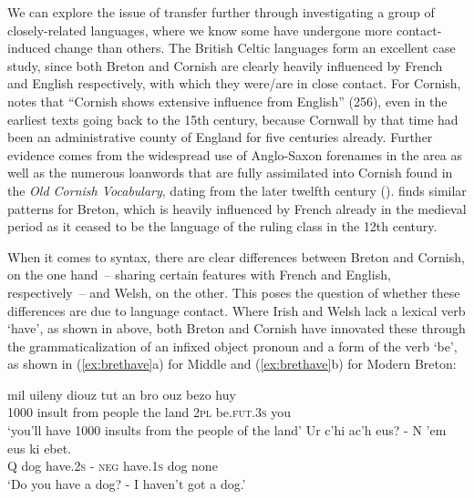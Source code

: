 \documentclass[output=paper,colorlinks,citecolor=brown]{langscibook}
\begin{document}
We can explore the issue of transfer further through investigating a group of closely-related languages, where we know some have undergone more contact-induced change than others. The British Celtic languages form an excellent case study, since both Breton and Cornish are clearly heavily influenced by French and English respectively, with which they were/are in close contact. For Cornish, \citet{mm:padel_english_2021} notes that ``Cornish shows extensive influence from English'' (256), even in the earliest texts going back to the 15th century, because Cornwall by that time had been an administrative county of England for five centuries already. Further evidence comes from the widespread use of Anglo-Saxon forenames in the area as well as the numerous loanwords that are fully assimilated into Cornish found in the \textit{Old Cornish Vocabulary}, dating from the later twelfth century (\citealt{mm:graves_old_1962}). \citet{mm:humphreys_breton_1992}  finds similar patterns for Breton, which is heavily influenced by French already in the medieval period as it ceased to be the language of the ruling class in the 12th century.

When it comes to syntax, there are clear differences between Breton and Cornish, on the one hand~-- sharing certain features with French and English, respectively~-- and Welsh, on the other. This poses the question of whether these differences are due to language contact. Where Irish and Welsh lack a lexical verb `have', as shown in  above, both Breton and Cornish have innovated these through the grammaticalization of an infixed object pronoun and a form of the verb `be', as shown in (\ref{ex:brethave}a) for Middle and (\ref{ex:brethave}b) for Modern Breton:

\ea
\ea
\settowidth{}
\gll mil	uileny	diouz		tut			an	bro		ouz		bezo				huy\\
	1000	insult		from		people	the	land	\textsc{2pl}		be.\textsc{fut}.\textsc{3s}	you\\
	\glt `you'll have 1000 insults from the people of the land' 
\ex
 \gll Ur c'hi {ac'h eus}? - N {'em eus} ki ebet.\\
 Q dog have.\textsc{2s} - \textsc{neg} have.\textsc{1s} dog none\\
 \glt `Do you have a dog? - I haven't got a dog.' 
\z
\label{ex:brethave}
\z
\end{document}

